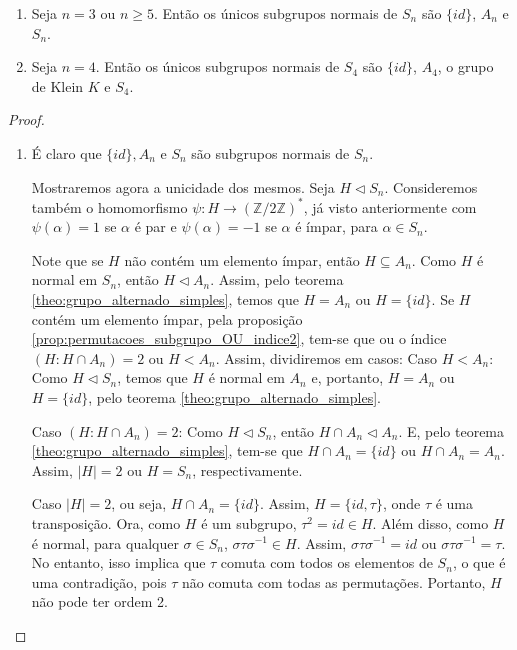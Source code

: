 \documentclass[11pt,openany]{book}
\begin{document}
\begin{proposition}
\label{prop:S_n_subgrupos_normais}
    \begin{enumerate}[label=\alph*)]
        \item Seja $n = 3$ ou $n \geq 5$. Então os únicos subgrupos normais de $S_n$ são $\{id\}$, $A_n$ e $S_n$.
        \item Seja $n = 4$. Então os únicos subgrupos normais de $S_4$ são $\{id\}$, $A_4$, o grupo de Klein $K$ e $S_4$.
    \end{enumerate}
\end{proposition}
\begin{proof}
    \begin{enumerate}[label=\alph*)]
        \item É claro que $\{id\}, A_n$ e $S_n$ são subgrupos normais de $S_n$.
        
        Mostraremos agora a unicidade dos mesmos. Seja $H \triangleleft S_n$. Consideremos também o homomorfismo $\psi: H \rightarrow (\mathbb{Z}/2\mathbb{Z})^*$, já visto anteriormente com $\psi(\alpha) = 1$ se $\alpha$ é par e $\psi(\alpha) = -1$ se $\alpha$ é ímpar, para $\alpha \in S_n$.

        Note que se $H$ não contém um elemento ímpar, então $H \subseteq A_n$. Como $H$ é normal em $S_n$, então $H \triangleleft A_n$. Assim, pelo teorema \ref{theo:grupo_alternado_simples}, temos que $H = A_n$ ou $H = \{id\}$.
        Se $H$ contém um elemento ímpar, pela proposição \ref{prop:permutacoes_subgrupo_OU_indice2}, tem-se que ou o índice $(H:H\cap A_n) = 2$ ou $H < A_n$. Assim, dividiremos em casos:
        Caso $H < A_n$: Como $H \triangleleft S_n$, temos que $H$ é normal em $A_n$ e, portanto, $H = A_n$ ou $H = \{id\}$, pelo teorema \ref{theo:grupo_alternado_simples}.

        Caso $(H:H\cap A_n) = 2$: Como $H \triangleleft S_n$, então $H \cap A_n \triangleleft A_n$. E, pelo teorema \ref{theo:grupo_alternado_simples}, tem-se que $H \cap A_n = \{id\}$ ou $H \cap A_n = A_n$. Assim, $|H| = 2$ ou $H = S_n$, respectivamente. 

        Caso $|H| = 2$, ou seja, $H \cap A_n = \{id\}$. Assim, $H = \{id, \tau\}$, onde $\tau$ é uma transposição. Ora, como $H$ é um subgrupo, $\tau^2 = id \in H$. Além disso, como $H$ é normal, para qualquer $\sigma \in S_n$, $\sigma \tau \sigma^{-1} \in H$. Assim, $\sigma \tau \sigma^{-1} = id$ ou $\sigma \tau \sigma^{-1} = \tau$. No entanto, isso implica que $\tau$ comuta com todos os elementos de $S_n$, o que é uma contradição, pois $\tau$ não comuta com todas as permutações. Portanto, $H$ não pode ter ordem 2.


\end{enumerate}
\end{proof}
\end{document}
